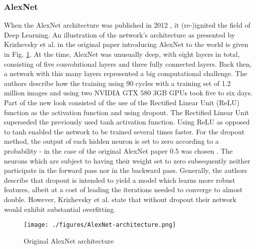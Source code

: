 \subsubsection{AlexNet}\label{alexnet}
When the AlexNet architecture was published in 2012 \citep{AlexNetoriginal}, it (re-)ignited the field of Deep Learning. An illustration of the network's architecture as presented by Krizhevsky et al. in the original paper introducing AlexNet to the world is given in Fig.  \ref{fig:alexnet}. At the time, AlexNet was unusually deep, with eight layers in total, consisting of five convolutional layers and three fully connected layers. Back then, a network with this many layers represented a big computational challenge. The authors describe how the training using 90 cycles with a training set of 1.2 million images and using two NVIDIA GTX 580 3GB GPUs took five to six days. Part of the new look consisted of the use of the Rectified Linear Unit (ReLU) function as the activation function and using dropout. The Rectified Linear Unit superseded the previously used tanh activation function. Using ReLU as opposed to tanh enabled the network to be trained several times faster. For the dropout method, the output of each hidden neuron is set to zero according to a probability - in the case of the original AlexNet paper 0.5 was chosen \citep{AlexNetoriginal}. The neurons which are subject to having their weight set to zero subsequently neither participate in the forward pass nor in the backward pass. Generally, the authors describe that dropout is intended to yield a model which learns more robust features, albeit at a cost of leading the iterations needed to converge to almost double. However, Krizhevsky et al. state that without dropout their network would exhibit substantial overfitting.
\begin{figure}[h]
	\centering
	\texttt{[image: ./figures/AlexNet-architecture.png]}
	\caption{Original AlexNet architecture}
	\label{fig:alexnet}
\end{figure}

